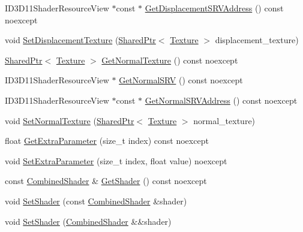 \begin{DoxyCompactItemize}
\item 
I\+D3\+D11\+Shader\+Resource\+View $\ast$const  $\ast$ \hyperlink{structmage_1_1_shaded_material_afc31aec2b4532b196306db049c3dddf6}{Get\+Displacement\+S\+R\+V\+Address} () const noexcept
\item 
void \hyperlink{structmage_1_1_shaded_material_ab96c9ab7165ebb330790b15460b53c3b}{Set\+Displacement\+Texture} (\hyperlink{namespacemage_a1e01ae66713838a7a67d30e44c67703e}{Shared\+Ptr}$<$ \hyperlink{classmage_1_1_texture}{Texture} $>$ displacement\+\_\+texture)
\item 
\hyperlink{namespacemage_a1e01ae66713838a7a67d30e44c67703e}{Shared\+Ptr}$<$ \hyperlink{classmage_1_1_texture}{Texture} $>$ \hyperlink{structmage_1_1_shaded_material_a879b003bf09d4985c028d134cdbe46eb}{Get\+Normal\+Texture} () const noexcept
\item 
I\+D3\+D11\+Shader\+Resource\+View $\ast$ \hyperlink{structmage_1_1_shaded_material_a5fd4dfbf132fa697fafbbac082ab8bdb}{Get\+Normal\+S\+RV} () const noexcept
\item 
I\+D3\+D11\+Shader\+Resource\+View $\ast$const  $\ast$ \hyperlink{structmage_1_1_shaded_material_a2b506a6d1ec48be536cb3318349bb2da}{Get\+Normal\+S\+R\+V\+Address} () const noexcept
\item 
void \hyperlink{structmage_1_1_shaded_material_a681531e5a979ebdc4a0e8933a2439c0f}{Set\+Normal\+Texture} (\hyperlink{namespacemage_a1e01ae66713838a7a67d30e44c67703e}{Shared\+Ptr}$<$ \hyperlink{classmage_1_1_texture}{Texture} $>$ normal\+\_\+texture)
\item 
float \hyperlink{structmage_1_1_shaded_material_af2843c2ec63800443e6fee28147cd8bb}{Get\+Extra\+Parameter} (size\+\_\+t index) const noexcept
\item 
void \hyperlink{structmage_1_1_shaded_material_acf33a3820b485d0402d132275ed4d515}{Set\+Extra\+Parameter} (size\+\_\+t index, float value) noexcept
\item 
const \hyperlink{structmage_1_1_combined_shader}{Combined\+Shader} \& \hyperlink{structmage_1_1_shaded_material_a1d1affd63d0a2dd8543a10600a267e0b}{Get\+Shader} () const noexcept
\item 
void \hyperlink{structmage_1_1_shaded_material_a65646872fce0961e7ac346be162e89ec}{Set\+Shader} (const \hyperlink{structmage_1_1_combined_shader}{Combined\+Shader} \&shader)
\item 
void \hyperlink{structmage_1_1_shaded_material_ae1c0fe052ef1cfb3c65ddf1ad9de8abb}{Set\+Shader} (\hyperlink{structmage_1_1_combined_shader}{Combined\+Shader} \&\&shader)
\end{DoxyCompactItemize}
